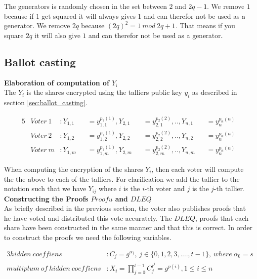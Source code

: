 \noindent
The generators is randomly chosen in the set between $2$ and $2q-1$.  We remove $1$ because if $1$ get squared it will always gives $1$ and can therefor not be used as a generator. We remove $2q$ because $(2q)^2 = 1 \ mod \ 2q+1$. That means if you square $2q$ it will also give $1$ and can therefor not be used as a generator.

\subsection{Ballot casting}

\textbf{Elaboration of computation of  $Y_i$}\\
The $Y_i$ is the shares encrypted using the talliers public key $y_i$ as described in section \ref{sec:ballot_casting}.
 
\begin{alignat*}{5}
&Voter \ 1&: Y_{1,1}&&=y_{1,1}^{p_1(1)},Y_{2,1}&&=y_{2,1}^{p_2(2)} ,.., Y_{n,1}&&=y_n^{p_n(n)}\\
&Voter \ 2&: Y_{1,2}&&=y_{1,2}^{p_1(1)},Y_{2,2}&&=y_{2,2}^{p_2(2)} ,.., Y_{n,2}&&=y_n^{p_n(n)}\\
&Voter \ \textit{m}&: Y_{1,m}&&=y_{1,m}^{p_1(1)} , Y_{2,m}&&=y_{2,m}^{p_2(2)} ,.., Y_{n,m}&&=y_n^{p_n(n)}
\end{alignat*}


\noindent
When computing the encryption of the shares $Y_i$, then each voter will compute the the above to each of the talliers. For clarification we add the tallier to the notation such that we have $Y_{ij}$ where $i$ is the $i$-th voter and $j$ is the $j$-th tallier. \\


\noindent
\textbf{Constructing the Proofs $Proofu$ and $DLEQ$}\\
As briefly described in the previous section, the voter also publishes proofs that he have voted and distributed this vote accurately. The $DLEQ$, proofs that each share have been constructed in the same manner and that this is correct. In order to construct the proofs we need the following variables. 

\begin{alignat*}{3}
hidden \ coeffiens &: C_j = g^{\alpha_j},\ j \in \{0,1,2,3,....,t-1 \}, \ where \ \alpha_0 = s  \\ 
multiplum \ of \ hidden \ coeffiens &: X_i = \prod\limits_{j=0}^{t-1} C_j^{i^j} =g^{p(i)}, 1\leq i\leq n
\end{alignat*}

